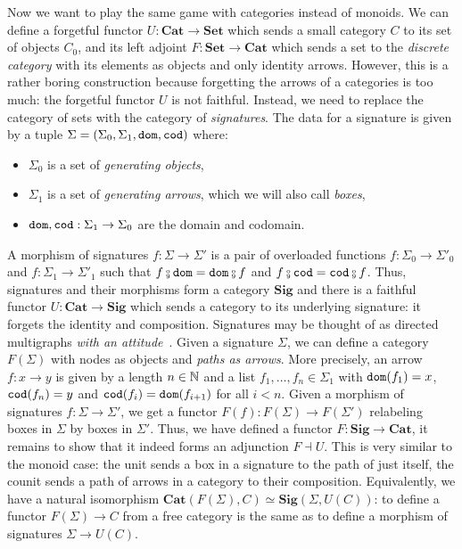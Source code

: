 Now we want to play the same game with categories instead of monoids.
We can define a forgetful functor $U : \mathbf{Cat} \to \mathbf{Set}$ which sends a small category $C$ to its set of objects $C_0$, and its left adjoint $F : \mathbf{Set} \to \mathbf{Cat}$ which sends a set to the \emph{discrete category} with its elements as objects and only identity arrows.
However, this is a rather boring construction because forgetting the arrows of a categories is too much: the forgetful functor $U$ is not faithful.
Instead, we need to replace the category of sets with the category of \emph{signatures}.
The data for a signature is given by a tuple $\Sigma = (\Sigma_0, \Sigma_1, \mathtt{dom}, \mathtt{cod})$ where:
\begin{itemize}
    \item $\Sigma_0$ is a set of \emph{generating objects},
    \item $\Sigma_1$ is a set of \emph{generating arrows}, which we will also call \emph{boxes},
    \item $\mathtt{dom}, \mathtt{cod} : \Sigma_1 \to \Sigma_0$ are the domain and codomain.
\end{itemize}
A morphism of signatures $f : \Sigma \to \Sigma'$ is a pair of overloaded functions $f : \Sigma_0 \to \Sigma'_0$ and $f : \Sigma_1 \to \Sigma'_1$ such that $f \fcmp \dom = \dom \fcmp f$ and $f \fcmp \cod = \cod \fcmp f$.
Thus, signatures and their morphisms form a category $\mathbf{Sig}$ and there is a faithful functor $U : \mathbf{Cat} \to \mathbf{Sig}$ which sends a category to its underlying signature: it forgets the identity and composition.
Signatures may be thought of as directed multigraphs \emph{with an attitude}~\cite{NLab}.
Given a signature $\Sigma$, we can define a category $F(\Sigma)$ with nodes as objects and \emph{paths as arrows}.
More precisely, an arrow $f : x \to y$ is given by a length $n \in \mathbb{N}$ and a list $f_1, \dots, f_n \in \Sigma_1$ with $\mathtt{dom}(f_1) = x$, $\mathtt{cod}(f_n) = y$ and $\mathtt{cod}(f_i) = \mathtt{dom}(f_{i + 1})$ for all $i < n$.
Given a morphism of signatures $f : \Sigma \to \Sigma'$, we get a functor $F(f) : F(\Sigma) \to F(\Sigma')$ relabeling boxes in $\Sigma$ by boxes in $\Sigma'$.
Thus, we have defined a functor $F : \mathbf{Sig} \to \mathbf{Cat}$, it remains to show that it indeed forms an adjunction $F \dashv U$.
This is very similar to the monoid case: the unit sends a box in a signature to the path of just itself, the counit sends a path of arrows in a category to their composition.
Equivalently, we have a natural isomorphism $\mathbf{Cat}(F(\Sigma), C) \simeq \mathbf{Sig}(\Sigma, U(C))$: to define a functor $F(\Sigma) \to C$ from a free category is the same as to define a morphism of signatures $\Sigma \to U(C)$.

